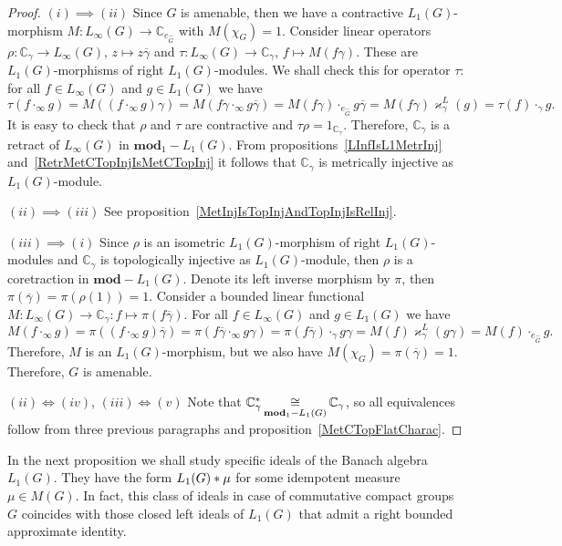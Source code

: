 \begin{proof} $(i)\implies (ii)$ Since $G$ is amenable, then we have a 
contractive $L_1(G)$-morphism $M:L_\infty(G)\to\mathbb{C}_{e_{\widehat{G}}}$
with $M(\chi_G)=1$. Consider linear 
operators $\rho:\mathbb{C}_\gamma\to L_\infty(G),\, z\mapsto z\overline{\gamma}$ 
and $\tau:L_\infty(G)\to\mathbb{C}_\gamma,\, f\mapsto M(f\gamma)$. These are
$L_1(G)$-morphisms of right $L_1(G)$-modules. We shall check this for operator
$\tau$: for all $f\in L_\infty(G)$ and $g\in L_1(G)$ we have
$$
\tau(f\cdot_\infty g)
=M((f\cdot_\infty g)\gamma)
=M(f\gamma\cdot_\infty g\overline{\gamma})
=M(f\gamma)\cdot_{e_{\widehat{G}}} g\overline{\gamma}
=M(f\gamma)\varkappa_\gamma^L(g)
=\tau(f)\cdot_{\gamma} g.
$$  
It is easy to check that $\rho$ and $\tau$ are contractive and
$\tau\rho=1_{\mathbb{C}_\gamma}$. Therefore, $\mathbb{C}_\gamma$ is a retract of
$L_\infty(G)$ in $\mathbf{mod}_1-L_1(G)$. From
propositions~\ref{LInfIsL1MetrInj} and~\ref{RetrMetCTopInjIsMetCTopInj} it 
follows that $\mathbb{C}_\gamma$ is metrically injective as $L_1(G)$-module.

$(ii)\implies (iii)$ See proposition~\ref{MetInjIsTopInjAndTopInjIsRelInj}.

$(iii) \implies (i)$ Since $\rho$ is an isometric $L_1(G)$-morphism of right
$L_1(G)$-modules and $\mathbb{C}_\gamma$ is topologically injective as
$L_1(G)$-module, then $\rho$ is a coretraction in $\mathbf{mod}-L_1(G)$. Denote
its left inverse morphism by $\pi$, then
$\pi(\overline{\gamma})=\pi(\rho(1))=1$. Consider a bounded linear functional
$M:L_\infty(G)\to\mathbb{C}_\gamma:f\mapsto \pi(f\overline{\gamma})$. For all
$f\in L_\infty(G)$ and $g\in L_1(G)$ we have
$$
M(f\cdot_\infty g)
=\pi((f\cdot_\infty g)\overline{\gamma})
=\pi(f\overline{\gamma}\cdot_\infty g\gamma)
=\pi(f\overline{\gamma})\cdot_{\gamma} g\gamma
=M(f)\varkappa_\gamma^L(g\gamma)
=M(f)\cdot_{e_{\widehat{G}}}g.
$$
Therefore, $M$ is an $L_1(G)$-morphism, but we also have
$M(\chi_G)=\pi(\overline{\gamma})=1$. Therefore, $G$ is amenable.

$(ii) \Longleftrightarrow (iv)$, $(iii) \Longleftrightarrow (v)$ Note that
$\mathbb{C}_\gamma^*\mathop{\mathbin{\cong}}\limits_{\mathbf{mod}_1-L_1(G)}\mathbb{C}_\gamma$, so all
equivalences  follow from three previous paragraphs and
proposition~\ref{MetCTopFlatCharac}.
\end{proof}

In the next proposition we shall study specific ideals of the Banach algebra
$L_1(G)$. They have the form $L_1(G)\ast\mu$ for some idempotent measure
$\mu\in M(G)$. In fact, this class of ideals in case of commutative compact groups $G$
coincides with those closed left ideals of $L_1(G)$ that admit a right bounded
approximate identity.

